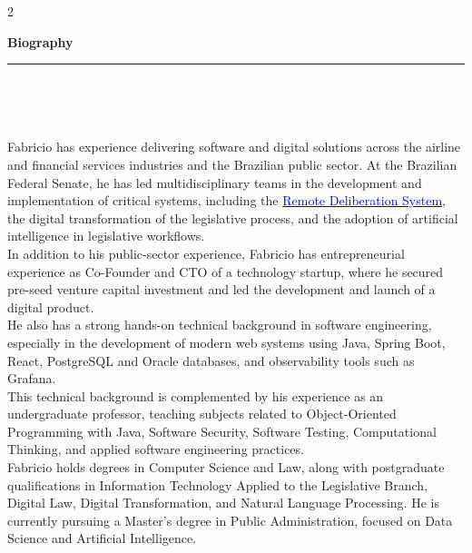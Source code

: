 \documentclass[10pt,A4,english]{article}
\newcommand{\mpwidth}{\linewidth-\fboxsep-\fboxsep}
\newcommand{\cvtext}[1] {
	\noindent\parbox{\mpwidth}{\RaggedRight #1}
}
\newcommand{\cvsection}[1] {
	\vspace{12pt}
	\cvtext{
		\textbf{\LARGE{\textcolor{darkcol}{#1}}}\\[-4pt]
		\textcolor{accentcol}{ \rule{0.2\textwidth}{1.5pt} } \\
	}
}
\begin{document}
\begin{paracol}{2}
\begin{leftcolumn}
\end{leftcolumn}

\begin{rightcolumn}

\cvsection{Biography}
\\[6pt]
\cvtext{
Fabricio has experience delivering software and digital solutions across the airline and financial services industries and the Brazilian public sector. At the Brazilian Federal Senate, he has led multidisciplinary teams in the development and implementation of critical systems, including the \href{https://www12.senado.leg.br/noticias/materias/2021/02/08/sistema-de-deliberacao-remota-do-senado-pode-se-tornar-permanente}{\textcolor{blue}{Remote Deliberation System}}, the digital transformation of the legislative process, and the adoption of artificial intelligence in legislative workflows.
\\[6pt]
In addition to his public-sector experience, Fabricio has entrepreneurial experience as Co-Founder and CTO of a technology startup, where he secured pre-seed venture capital investment and led the development and launch of a digital product.
\\[6pt]
He also has a strong hands-on technical background in software engineering, especially in the development of modern web systems using Java, Spring Boot, React, PostgreSQL and Oracle databases, and observability tools such as Grafana. 
\\[6pt]
This technical background is complemented by his experience as an undergraduate professor, teaching subjects related to Object-Oriented Programming with Java, Software Security, Software Testing, Computational Thinking, and applied software engineering practices.
\\[6pt]
Fabricio holds degrees in Computer Science and Law, along with postgraduate qualifications in Information Technology Applied to the Legislative Branch, Digital Law, Digital Transformation, and Natural Language Processing. He is currently pursuing a Master's degree in Public Administration, focused on Data Science and Artificial Intelligence.

}


\end{rightcolumn}
\end{paracol}
\end{document}
